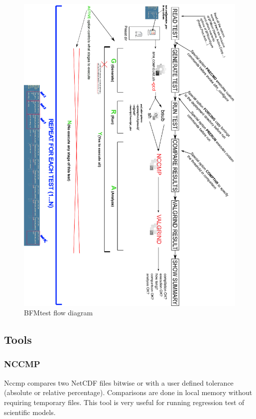 \begin{figure}
  \centering
  \includegraphics[angle=90]{img/bfmtest.ps}
  \caption{BFMtest flow diagram}
  \label{fig:bfmtest}
\end{figure}
\clearpage

\subsection{Tools}\label{subsec:soft_tools}
\subsubsection{NCCMP}\label{subsubsec:tools_nccmp}

Nccmp compares two NetCDF files bitwise or with a user defined tolerance (absolute or relative percentage). Comparisons are done in local memory without requiring temporary files. This tool is very useful for running regression test of scientific models.

